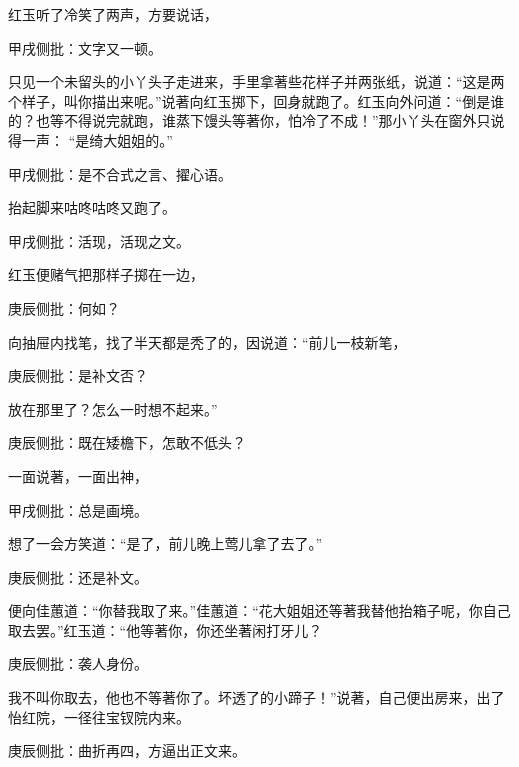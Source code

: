 \begin{parag}
    红玉听了冷笑了两声，方要说话，\begin{note}甲戌侧批：文字又一顿。\end{note}只见一个未留头的小丫头子走进来，手里拿著些花样子并两张纸，说道：“这是两个样子，叫你描出来呢。”说著向红玉掷下，回身就跑了。红玉向外问道：“倒是谁的？也等不得说完就跑，谁蒸下馒头等著你，怕冷了不成！”那小丫头在窗外只说得一声： “是绮大姐姐的。”\begin{note}甲戌侧批：是不合式之言、擢心语。\end{note}抬起脚来咕咚咕咚又跑了。\begin{note}甲戌侧批：活现，活现之文。\end{note}红玉便赌气把那样子掷在一边，\begin{note}庚辰侧批：何如？\end{note}向抽屉内找笔，找了半天都是秃了的，因说道：“前儿一枝新笔，\begin{note}庚辰侧批：是补文否？\end{note}放在那里了？怎么一时想不起来。”\begin{note}庚辰侧批：既在矮檐下，怎敢不低头？\end{note}一面说著，一面出神，\begin{note}甲戌侧批：总是画境。\end{note}想了一会方笑道：“是了，前儿晚上莺儿拿了去了。”\begin{note}庚辰侧批：还是补文。\end{note}便向佳蕙道：“你替我取了来。”佳蕙道：“花大姐姐还等著我替他抬箱子呢，你自己取去罢。”红玉道：“他等著你，你还坐著闲打牙儿？\begin{note}庚辰侧批：袭人身份。\end{note}我不叫你取去，他也不等著你了。坏透了的小蹄子！”说著，自己便出房来，出了怡红院，一径往宝钗院内来。\begin{note}庚辰侧批：曲折再四，方逼出正文来。\end{note}
\end{parag}


